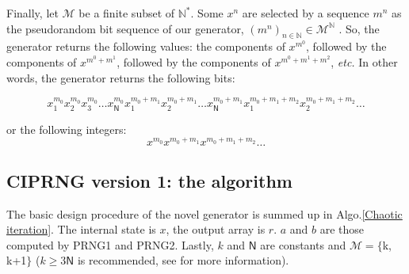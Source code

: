 Finally, let $\mathcal{M}$ be a finite subset of $\mathds{N}^*$. Some $x^n$ are selected by a sequence $m^n$ as the pseudorandom bit sequence of our generator, $(m^n)_{n \in \mathds{N}} \in \mathcal{M}^\mathds{N}$ . So, the generator returns the following values: the components of $x^{m^0}$, followed by the components of $x^{m^0+m^1}$, followed by the components of $x^{m^0+m^1+m^2}$, \emph{etc.} In other words, the generator returns the following bits:

$$x_1^{m_0}x_2^{m_0}x_3^{m_0}\hdots x_\mathsf{N}^{m_0}x_1^{m_0+m_1}x_2^{m_0+m_1}\hdots x_\mathsf{N}^{m_0+m_1} x_1^{m_0+m_1+m_2}x_2^{m_0+m_1+m_2}\hdots$$

\noindent or the following integers:$$x^{m_0}x^{m_0+m_1}x^{m_0+m_1+m_2}\hdots$$


\subsection{CIPRNG version 1: the algorithm}
The basic design procedure of the novel generator is summed up in Algo.\ref{Chaotic iteration}. The internal state is $x$, the output array is $r$. $a$ and $b$ are those computed by PRNG1 and PRNG2. Lastly, $k$ and $\mathsf{N}$ are constants and \linebreak $\mathcal{M}=\{$k, k+1$\}$ ($k\geqslant 3\mathsf{N}$ is recommended, see \cite{bibtexwangqianxue} for more information).


